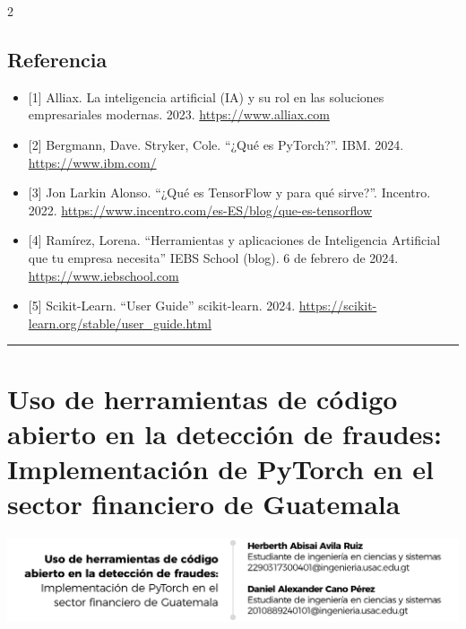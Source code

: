 \documentclass[12pt,spanish,Letterpaper,openany]{book}
\newcommand{\HRule}{\begin{center}\rule{0.5\linewidth}{0.2mm}\end{center}}
\begin{document}
\begin {multicols}{2}
\hypertarget{referencia}{%
\section{Referencia}\label{referencia}}

\begin{itemize}
\item
  {[}1{]} Alliax. La inteligencia artificial (IA) y su rol en las soluciones empresariales modernas. 2023.
  \href{https://www.alliax.com/la-inteligencia-artificial-ia-y-su-rol-en-las-soluciones-empresariales-modernas/}{https://www.alliax.com}
\item
  {[}2{]} Bergmann, Dave. Stryker, Cole. ``¿Qué es PyTorch?''. IBM. 2024. \href{https://www.ibm.com/mx-es/topics/pytorch\#:~:text=PyTorch\%20es\%20un\%20marco\%20de,alto\%20nivel\%20basada\%20en\%20Python\%20}{https://www.ibm.com/}
\item
  {[}3{]} Jon Larkin Alonso. ``¿Qué es TensorFlow y para qué sirve?''. Incentro. 2022.
  \url{https://www.incentro.com/es-ES/blog/que-es-tensorflow}
\item
  {[}4{]} Ramírez, Lorena. ``Herramientas y aplicaciones de Inteligencia Artificial que tu empresa necesita'' IEBS School (blog). 6 de febrero de 2024.
  \href{https://www.iebschool.com/blog/herramientas-aplicaciones-inteligencia-artificial-big-data/}{https://www.iebschool.com}
\item
  {[}5{]} Scikit-Learn. ``User Guide'' scikit-learn. 2024. \url{https://scikit-learn.org/stable/user_guide.html}
\end{itemize}

\end {multicols}

\medskip

\HRule

\medskip

\hypertarget{pareja65}{%
\chapter{Uso de herramientas de código abierto en la detección de fraudes: Implementación de PyTorch en el sector financiero de Guatemala}\label{pareja65}}

\begin{center}\includegraphics[width=1\linewidth]{autores/pareja65_01} \end{center}
\end{document}
